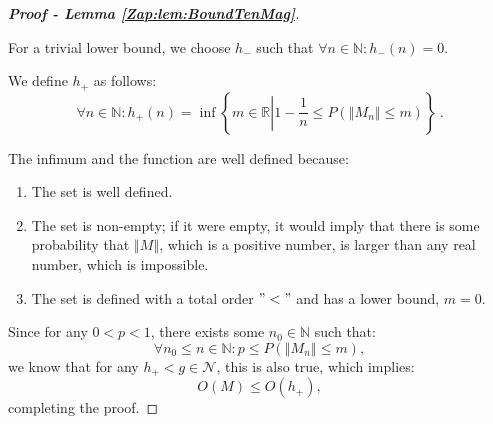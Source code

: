 \documentclass{article} %
\begin{document}
\begin{proof}[\textbf{Proof - Lemma \ref{Zap:lem:BoundTenMag}}]
\

For a trivial lower bound, we choose \(h_-\) such that \(\forall n \in \mathbb{N}: h_-(n) = 0\).

We define \(h_+\) as follows:
\begin{equation}
\forall n \in \mathbb{N}: h_+\left(n\right) = \inf\left\{ m \in \mathbb{R} \left| 1 - \frac{1}{n} \leq P\left(\left\Vert M_n\right\Vert \leq m\right)\right.\right\} \ .
\end{equation}

The infimum and the function are well defined because:
\begin{enumerate}
\item The set is well defined.
\item 
The set is non-empty; if it were empty, it would imply that there is some probability that \(\left\Vert M\right\Vert\), which is a positive number, is larger than any real number, which is impossible.
\item The set is defined with a total order \("<"\) and has a lower bound, \(m = 0\).
\end{enumerate}

Since for any \(0 < p < 1\), there exists some \(n_0 \in \mathbb{N}\) such that:
\begin{equation}
\forall n_0 \leq n \in \mathbb{N}: p \leq P\left(\left\Vert M_n\right\Vert \leq m\right),
\end{equation}
we know that for any \(h_+ < g \in \mathcal{N}\), this is also true, which implies:
\begin{equation}
    O(M) \leq O\left(h_+\right),
\end{equation}
completing the proof.
\end{proof}
\end{document}
